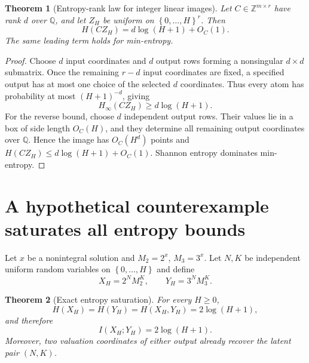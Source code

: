 \documentclass[11pt,oneside]{article}
\newtheorem{theorem}{Theorem}[section]
\theoremstyle{definition}
\theoremstyle{remark}
\newcommand{\Mtwo}{M_2}
\newcommand{\Mthree}{M_3}
\newcommand{\Q}{\mathbb{Q}}
\newcommand{\Z}{\mathbb{Z}}
\newcommand{\Hinf}{H_{\infty}}
\newcommand{\set}[1]{\left\{#1\right\}}
\begin{document}
\begin{theorem}[Entropy-rank law for integer linear images]
\label{thm:entropy-rank}
Let $C\in\Z^{m\times r}$ have rank $d$ over $\Q$, and let $Z_H$ be uniform on $\set{0,\dots,H}^r$.  Then
\begin{equation}
 H(CZ_H)=d\log(H+1)+O_C(1).
 \label{eq:entropy-rank}
\end{equation}
The same leading term holds for min-entropy.
\end{theorem}

\begin{proof}
Choose $d$ input coordinates and $d$ output rows forming a nonsingular $d\times d$ submatrix.  Once the remaining $r-d$ input coordinates are fixed, a specified output has at most one choice of the selected $d$ coordinates.  Thus every atom has probability at most $(H+1)^{-d}$, giving
\[
 \Hinf(CZ_H)\ge d\log(H+1).
\]
For the reverse bound, choose $d$ independent output rows.  Their values lie in a box of side length $O_C(H)$, and they determine all remaining output coordinates over $\Q$.  Hence the image has $O_C(H^d)$ points and
$H(CZ_H)\le d\log(H+1)+O_C(1)$.  Shannon entropy dominates min-entropy.
\end{proof}

\section{A hypothetical counterexample saturates all entropy bounds}
\label{sec:entropy-saturation}

Let $x$ be a nonintegral solution and $\Mtwo=2^x$, $\Mthree=3^x$.  Let $N,K$ be independent uniform random variables on $\set{0,\dots,H}$ and define
\begin{equation}
 X_H=2^N\Mtwo^K,
 \qquad
 Y_H=3^N\Mthree^K.
 \label{eq:random-semigroup}
\end{equation}

\begin{theorem}[Exact entropy saturation]
\label{thm:entropy-saturation}
For every $H\ge0$,
\begin{equation}
 H(X_H)=H(Y_H)=H(X_H,Y_H)=2\log(H+1),
 \label{eq:entropy-values}
\end{equation}
and therefore
\begin{equation}
 I(X_H;Y_H)=2\log(H+1).
 \label{eq:mutual-info}
\end{equation}
Moreover, two valuation coordinates of either output already recover the latent pair $(N,K)$.
\end{theorem}
\end{document}

